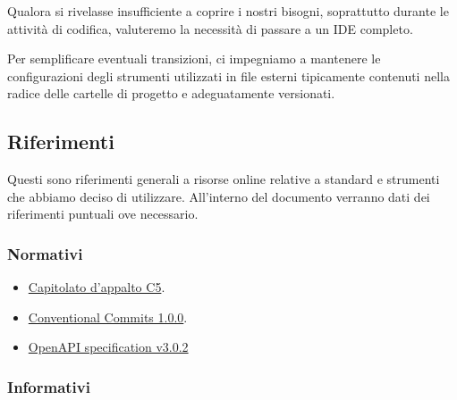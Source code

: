 \documentclass[../norme-di-progetto.tex]{subfiles}
\begin{document}
Qualora si rivelasse insufficiente a coprire i nostri bisogni, soprattutto durante le attività di codifica, valuteremo la necessità di passare a un IDE completo.

Per semplificare eventuali transizioni, ci impegniamo a mantenere le configurazioni degli strumenti utilizzati in file esterni tipicamente contenuti nella radice delle cartelle di progetto e adeguatamente versionati.

\subsection{Riferimenti}%
\label{sub:riferimenti}

Questi sono riferimenti generali a risorse online relative a standard e strumenti che abbiamo deciso di utilizzare.
All'interno del documento verranno dati dei riferimenti puntuali ove necessario.

\subsubsection{Normativi}%
\label{subs:riferimenti/normativi}

\begin{itemize}
  \item \href{https://www.math.unipd.it/~tullio/IS-1/2019/Progetto/C5.pdf}{Capitolato d'appalto C5}.
  \item \href{https://www.conventionalcommits.org/en/v1.0.0/}{Conventional Commits 1.0.0}.
  \item \href{https://spec.openapis.org/oas/v3.0.2}{OpenAPI specification v3.0.2}
\end{itemize}

\subsubsection{Informativi}%
\label{subs:riferimenti/informativi}
\end{document}
